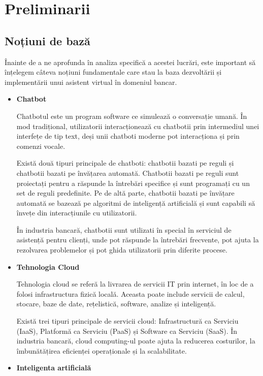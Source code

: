 \chapter{Preliminarii}

\section{Noțiuni de bază}

Înainte de a ne aprofunda în analiza specifică a acestei lucrări, este important să înțelegem câteva noțiuni fundamentale care stau la baza dezvoltării și implementării unui asistent virtual în domeniul bancar.

\begin{itemize}
    \item \textbf{Chatbot} 

Chatbotul este un program software ce simulează o conversație umană. În mod tradițional, utilizatorii interacționează cu chatbotii prin intermediul unei interfețe de tip text, deși unii chatboti moderne pot interacționa și prin comenzi vocale.

Există două tipuri principale de chatboti: chatbotii bazati pe reguli și chatbotii bazati pe învățarea automată. Chatbotii bazati pe reguli sunt proiectați pentru a răspunde la întrebări specifice și sunt programați cu un set de reguli predefinite. Pe de altă parte, chatbotii bazati pe învățare automată se bazează pe algoritmi de inteligență artificială și sunt capabili să învețe din interacțiunile cu utilizatorii.

În industria bancară, chatbotii sunt utilizati în special în serviciul de asistență pentru clienți, unde pot răspunde la întrebări frecvente, pot ajuta la rezolvarea problemelor și pot ghida utilizatorii prin diferite procese.

    \item \textbf{Tehnologia Cloud}

Tehnologia cloud se referă la livrarea de servicii IT prin internet, în loc de a folosi infrastructura fizică locală. Aceasta poate include servicii de calcul, stocare, baze de date, rețelistică, software, analize și inteligență.

Există trei tipuri principale de servicii cloud: Infrastructură ca Serviciu (IaaS), Platformă ca Serviciu (PaaS) și Software ca Serviciu (SaaS). În industria bancară, cloud computing-ul poate ajuta la reducerea costurilor, la îmbunătățirea eficienței operaționale și la scalabilitate.

    \item \textbf{Inteligenta artificială} 


\end{itemize}
